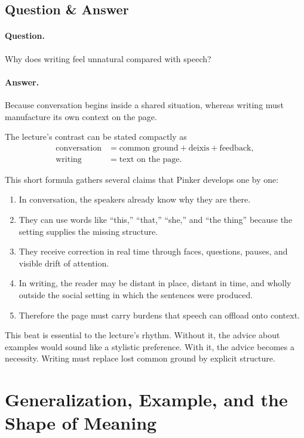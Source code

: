\subsection{Question \& Answer}

\paragraph{Question.} Why does writing feel unnatural compared with speech?

\paragraph{Answer.} Because conversation begins inside a shared situation, whereas writing must manufacture its own context on the page.

The lecture's contrast can be stated compactly as
\begin{align}
\text{conversation} &= \text{common ground} + \text{deixis} + \text{feedback},\\
\text{writing} &= \text{text on the page}.
\end{align}

This short formula gathers several claims that Pinker develops one by one:
\begin{enumerate}
\item In conversation, the speakers already know why they are there.
\item They can use words like ``this,'' ``that,'' ``she,'' and ``the thing'' because the setting supplies the missing structure.
\item They receive correction in real time through faces, questions, pauses, and visible drift of attention.
\item In writing, the reader may be distant in place, distant in time, and wholly outside the social setting in which the sentences were produced.
\item Therefore the page must carry burdens that speech can offload onto context.
\end{enumerate}

This beat is essential to the lecture's rhythm. Without it, the advice about examples would sound like a stylistic preference. With it, the advice becomes a necessity. Writing must replace lost common ground by explicit structure.

\section{Generalization, Example, and the Shape of Meaning}

